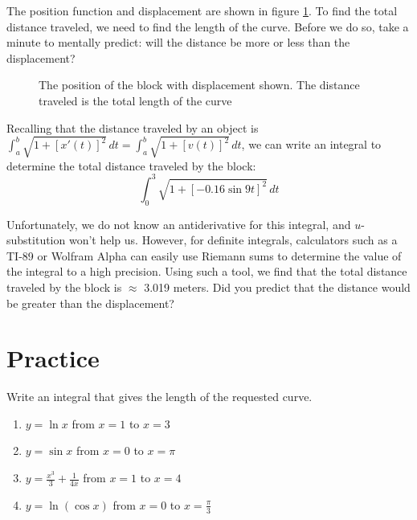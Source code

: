 The position function and displacement are shown in figure 
\ref{fig:block}. To find the total distance traveled, we need to find 
the length of the curve. Before we do so, take a minute to mentally 
predict: will the distance be more or less than the displacement?

\begin{figure}[htbp]
\centering
    \caption{The position of the block with displacement shown. The 
    distance traveled is the total length of the curve}
    \label{fig:block}
\end{figure}

Recalling that the distance traveled by an object is 
$\int_a^b \sqrt{1+[x'(t)]^2}\,dt = \int_a^b \sqrt{1 + [v(t)]^2}\,dt$, 
we can write an integral to determine the total distance traveled by the block:
$$\int_0^3 \sqrt{1 + [-0.16\sin{9t}]^2}\,dt$$

Unfortunately, we do not know an antiderivative for this integral, and 
$u$-substitution won't help us. However, for definite integrals, 
calculators such as a TI-89 or Wolfram Alpha can easily use Riemann 
sums to determine the value of the integral to a high precision. Using 
such a tool, we find that the total distance traveled by the block is 
$\approx$ 3.019 meters. Did you predict that the distance would be 
greater than the displacement?

\section{Practice}

\begin{Exercise}[label=length1]
Write an integral that gives the length of the requested curve.
	\begin{enumerate}
	\item $y = \ln{x}$ from $x = 1$ to $x = 3$
	\item $y = \sin{x}$ from $x = 0$ to $x = \pi$
	\item $y = \frac{x^3}{3} + \frac{1}{4x}$ from $x = 1$ to $x = 4$
	\item $y = \ln{(\cos{x})}$ from $x = 0$ to $x = \frac{\pi}{3}$
	\end{enumerate}	 
\end{Exercise}

